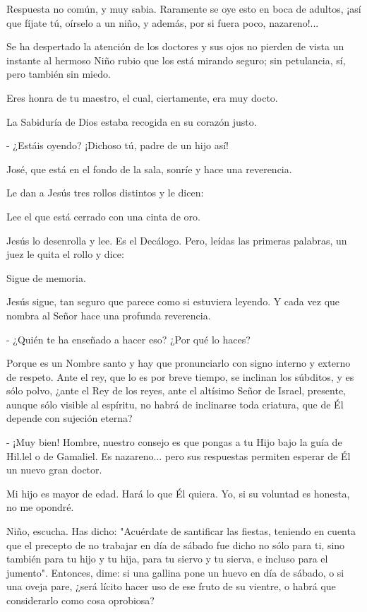\documentclass[12pt, twoside, openright]{book} %
\begin{document}
Respuesta no común, y muy sabia. Raramente se oye esto en boca de adultos, ¡así que fíjate tú, oírselo a un niño, y además, por si fuera poco, nazareno!... 

Se ha despertado la atención de los doctores y sus ojos no pierden de vista un instante al hermoso Niño rubio que los está mirando seguro; sin petulancia, sí, pero también sin miedo. 

Eres honra de tu maestro, el cual, ciertamente, era muy docto. 

La Sabiduría de Dios estaba recogida en su corazón justo. 

- ¿Estáis oyendo? ¡Dichoso tú, padre de un hijo así! 

José, que está en el fondo de la sala, sonríe y hace una reverencia. 

Le dan a Jesús tres rollos distintos y le dicen: 

Lee el que está cerrado con una cinta de oro. 

Jesús lo desenrolla y lee. Es el Decálogo. Pero, leídas las primeras palabras, un juez le quita el rollo y dice: 

Sigue de memoria. 

Jesús sigue, tan seguro que parece como si estuviera leyendo. Y cada vez que nombra al Señor hace una profunda reverencia. 

- ¿Quién te ha enseñado a hacer eso? ¿Por qué lo haces? 

Porque es un Nombre santo y hay que pronunciarlo con signo interno y externo de respeto. Ante el rey, que lo es por breve tiempo, se inclinan los súbditos, y es sólo polvo, ¿ante el Rey de los reyes, ante el altísimo Señor de Israel, presente, aunque sólo visible al espíritu, no habrá de inclinarse toda criatura, que de Él depende con sujeción eterna? 

- ¡Muy bien! Hombre, nuestro consejo es que pongas a tu Hijo bajo la guía de Hil.lel o de Gamaliel. Es nazareno... pero sus respuestas permiten esperar de Él un nuevo gran doctor. 

Mi hijo es mayor de edad. Hará lo que Él quiera. Yo, si su voluntad es honesta, no me opondré. 

Niño, escucha. Has dicho: "Acuérdate de santificar las fiestas, teniendo en cuenta que el precepto de no trabajar en día de sábado fue dicho no sólo para ti, sino también para tu hijo y tu hija, para tu siervo y tu sierva, e incluso para el jumento". Entonces, dime: si una gallina pone un huevo en día de sábado, o si una oveja pare, ¿será lícito hacer uso de ese fruto de su vientre, o habrá que considerarlo como cosa oprobiosa? 
\end{document}
